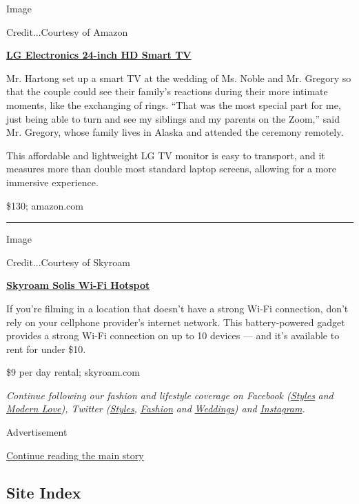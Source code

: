 Image

Credit...Courtesy of Amazon

\textbf{\href{https://www.amazon.com/LG-Electronics-24LM530S-PU-24-Inch-webOS/dp/B086XL48ZF/ref=sr_1_2?dchild=1\&keywords=24-inch+smart+tv\&qid=1593109780\&s=tv\&sr=1-2}{LG
Electronics 24-inch HD Smart TV}}

Mr. Hartong set up a smart TV at the wedding of Ms. Noble and Mr.
Gregory so that the couple could see their family's reactions during
their more intimate moments, like the exchanging of rings. ``That was
the most special part for me, just being able to turn and see my
siblings and my parents on the Zoom,'' said Mr. Gregory, whose family
lives in Alaska and attended the ceremony remotely.

This affordable and lightweight LG TV monitor is easy to transport, and
it measures more than double most standard laptop screens, allowing for
a more immersive experience.

\$130; amazon.com

\begin{center}\rule{0.5\linewidth}{\linethickness}\end{center}

Image

Credit...Courtesy of Skyroam

\textbf{\href{https://www.skyroam.com/skyroam-hotspot-rental}{Skyroam
Solis Wi-Fi Hotspot}}

If you're filming in a location that doesn't have a strong Wi-Fi
connection, don't rely on your cellphone provider's internet network.
This battery-powered gadget provides a strong Wi-Fi connection on up to
10 devices --- and it's available to rent for under \$10.

\$9 per day rental; skyroam.com

\emph{Continue following our fashion and lifestyle coverage on Facebook
(}\href{https://www.facebookcorewwwi.onion/nytimesstyles}{\emph{Styles}}
\emph{and}
\href{https://www.facebookcorewwwi.onion/modernlove}{\emph{Modern
Love}}\emph{), Twitter
(}\href{https://twitter.com/nytstyles}{\emph{Styles}}\emph{,}
\href{https://twitter.com/nytfashion}{\emph{Fashion}} \emph{and}
\href{https://twitter.com/nytimesvows}{\emph{Weddings}}\emph{) and}
\href{https://instagram.com/nytimesfashion}{\emph{Instagram}}\emph{.}

Advertisement

\protect\hyperlink{after-bottom}{Continue reading the main story}

\hypertarget{site-index}{%
\subsection{Site Index}\label{site-index}}

